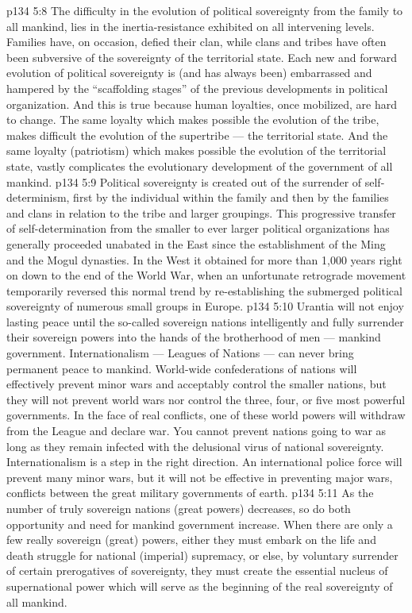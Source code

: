 \vs p134 5:8 The difficulty in the evolution of political sovereignty from the family to all mankind, lies in the inertia\hyp{}resistance exhibited on all intervening levels. Families have, on occasion, defied their clan, while clans and tribes have often been subversive of the sovereignty of the territorial state. Each new and forward evolution of political sovereignty is (and has always been) embarrassed and hampered by the “scaffolding stages” of the previous developments in political organization. And this is true because human loyalties, once mobilized, are hard to change. The same loyalty which makes possible the evolution of the tribe, makes difficult the evolution of the supertribe --- the territorial state. And the same loyalty (patriotism) which makes possible the evolution of the territorial state, vastly complicates the evolutionary development of the government of all mankind.
\vs p134 5:9 Political sovereignty is created out of the surrender of self\hyp{}determinism, first by the individual within the family and then by the families and clans in relation to the tribe and larger groupings. This progressive transfer of self\hyp{}determination from the smaller to ever larger political organizations has generally proceeded unabated in the East since the establishment of the Ming and the Mogul dynasties. In the West it obtained for more than 1,000 years right on down to the end of the World War, when an unfortunate retrograde movement temporarily reversed this normal trend by re\hyp{}establishing the submerged political sovereignty of numerous small groups in Europe.
\vs p134 5:10 Urantia will not enjoy lasting peace until the so\hyp{}called sovereign nations intelligently and fully surrender their sovereign powers into the hands of the brotherhood of men --- mankind government. Internationalism --- Leagues of Nations --- can never bring permanent peace to mankind. World\hyp{}wide confederations of nations will effectively prevent minor wars and acceptably control the smaller nations, but they will not prevent world wars nor control the three, four, or five most powerful governments. In the face of real conflicts, one of these world powers will withdraw from the League and declare war. You cannot prevent nations going to war as long as they remain infected with the delusional virus of national sovereignty. Internationalism is a step in the right direction. An international police force will prevent many minor wars, but it will not be effective in preventing major wars, conflicts between the great military governments of earth.
\vs p134 5:11 As the number of truly sovereign nations (great powers) decreases, so do both opportunity and need for mankind government increase. When there are only a few really sovereign (great) powers, either they must embark on the life and death struggle for national (imperial) supremacy, or else, by voluntary surrender of certain prerogatives of sovereignty, they must create the essential nucleus of supernational power which will serve as the beginning of the real sovereignty of all mankind.
